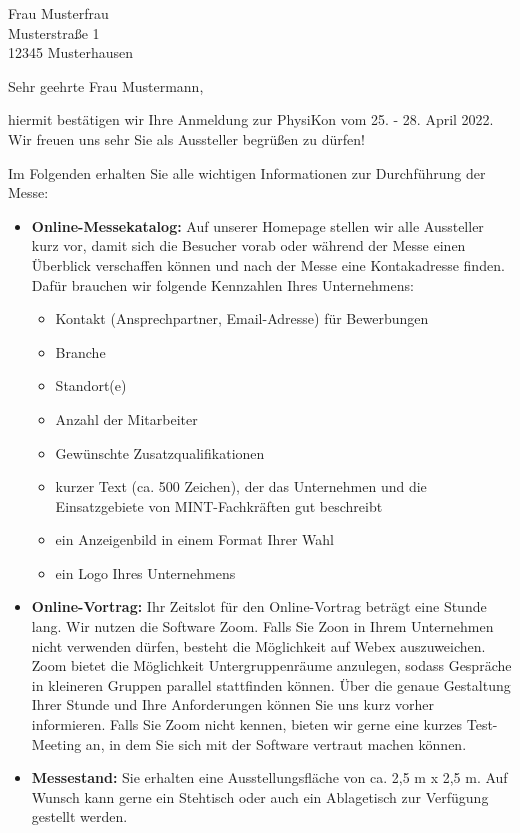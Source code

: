 \documentclass[
  pepbrief,
  fontsize=12pt,
  paper=a4,
  DIV=14,
  parskip=half,
  backaddress=false,
]{scrlttr2}
\author{Lena Linhoff}
\begin{document}
\begin{letter}{%
  Frau Musterfrau \\
  Musterstraße 1 \\
  12345 Musterhausen
}
\opening{Sehr geehrte Frau Mustermann,}
hiermit bestätigen wir Ihre Anmeldung zur PhysiKon vom 25. - 28. April 2022. Wir freuen uns sehr Sie als Aussteller begrüßen zu dürfen!

Im Folgenden erhalten Sie alle wichtigen Informationen zur Durchführung der Messe:

\begin{itemize}
  \item \textbf{Online-Messekatalog:}
  Auf unserer Homepage stellen wir alle Aussteller kurz vor, damit sich die Besucher vorab oder während der Messe einen Überblick verschaffen können und nach der Messe eine Kontakadresse finden.
  Dafür brauchen wir folgende Kennzahlen Ihres Unternehmens:
  \begin{itemize}
    \item Kontakt (Ansprechpartner, Email-Adresse) für Bewerbungen
    \item Branche
    \item Standort(e)
    \item Anzahl der Mitarbeiter
    \item Gewünschte Zusatzqualifikationen
    \item kurzer Text (ca. 500 Zeichen), der das Unternehmen und die Einsatzgebiete von MINT-Fachkräften gut beschreibt
    \item ein Anzeigenbild in einem Format Ihrer Wahl
    \item ein Logo Ihres Unternehmens
  \end{itemize}
  \item \textbf{Online-Vortrag:} Ihr Zeitslot für den Online-Vortrag beträgt eine Stunde lang.
  Wir nutzen die Software Zoom.
  Falls Sie Zoon in Ihrem Unternehmen nicht verwenden dürfen, besteht die Möglichkeit auf Webex auszuweichen.
  Zoom bietet die Möglichkeit Untergruppenräume anzulegen, sodass Gespräche in kleineren Gruppen parallel stattfinden können.
  Über die genaue Gestaltung Ihrer Stunde und Ihre Anforderungen können Sie uns kurz vorher informieren.
  Falls Sie Zoom nicht kennen, bieten wir gerne eine kurzes Test-Meeting an, in dem Sie sich mit der Software vertraut machen können.
  \item \textbf{Messestand:} Sie erhalten eine Ausstellungsfläche von ca. 2,5 m x 2,5 m.
  Auf Wunsch kann gerne ein Stehtisch oder auch ein Ablagetisch zur Verfügung gestellt werden.

\end{itemize}
\end{letter}
\end{document}
